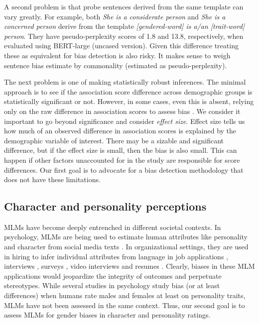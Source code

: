A second problem is that probe sentences derived from the same template can vary greatly.
%
For example, both \textit{She is a considerate person} and \textit{She is a concerned person} derive from the template \textit{[gendered-word] is a/an [trait-word] person}.
%
They have pseudo-perplexity scores of 1.8 and 13.8, respectively, when evaluated using BERT-large (uncased version).
%
Given this difference treating these as equivalent for bias detection is also risky. 
%
It makes sense to weigh sentence bias estimate by commonality (estimated as pseudo-perplexity).


The next problem is one of making statistically robust inferences. The minimal approach is to see if the association score difference across demographic groups is statistically significant or not. 
%
However, in some cases, even this is absent, relying only on the raw difference in association scores to assess bias \cite{limisiewicz-marecek-2022-dont,guo2022auto,kaneko-bollegala-2021-debiasing}.
%
We consider it important to go beyond significance and consider \emph{effect size}.
%
Effect size tells us how much of an observed difference in association scores is explained by the demographic variable of interest.
%
There may be a sizable and significant difference, but if the effect size is small, then the bias is also small.  
%
This can happen if other factors unaccounted for in the study are responsible for score differences.
%
Our first goal is to advocate for a bias detection methodology that does not have these limitations.


\subsection{Character and personality perceptions}

\noindent MLMs have become deeply entrenched in different societal contexts.  In psychology, MLMs are being used to estimate human attributes like personality and character from social media texts \cite{park2015automatic, liou2023online, pang2020language}. 
%
In organizational settings, they are used in hiring to infer individual attributes from language in job applications \cite{thompson2023deep}, interviews \cite{hickman2022automated}, surveys \cite{speer2023turning}, video interviews and resumes \cite{booth2021bias, gagandeep2023evaluating}.
%
Clearly, biases in these MLM applications would jeopardize the integrity of outcomes and perpetuate stereotypes.
%
While several studies in psychology study bias (or at least differences) when humans rate males and females at least on personality traits, MLMs have not been assessed in the same context.
%
Thus, our second goal is to assess MLMs for gender biases in character and personality ratings. 

